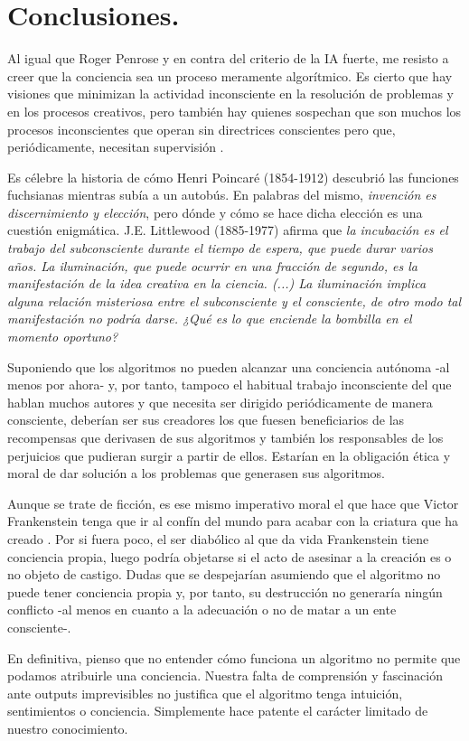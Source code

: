 \documentclass[main.tex]{subfiles}
\begin{document}
\chapter*{Conclusiones.}

Al igual que Roger Penrose y en contra del criterio de la IA fuerte, me resisto a creer que la conciencia sea un proceso meramente algorítmico. Es cierto que hay visiones  que minimizan la actividad inconsciente en la resolución de problemas y en los procesos creativos, pero también hay quienes sospechan que son muchos los procesos inconscientes  que operan sin directrices conscientes pero que, periódicamente, necesitan supervisión \cite{ucm}.

Es célebre la historia de cómo Henri Poincaré (1854-1912) descubrió las funciones fuchsianas mientras subía a un autobús. En palabras del mismo, \textit{invención es discernimiento y elección}, pero dónde y cómo se hace dicha elección es una cuestión enigmática. J.E. Littlewood (1885-1977) afirma que \textit{la incubación es el trabajo del subconsciente durante el tiempo de espera, que puede durar varios años. La iluminación, que puede ocurrir en una fracción de segundo, es la manifestación de la idea creativa en la ciencia. (...) La iluminación implica alguna relación misteriosa entre el subconsciente y el consciente, de otro modo tal manifestación no podría darse. ¿Qué es lo que enciende la bombilla en el momento oportuno?}


Suponiendo que los algoritmos no pueden alcanzar una conciencia autónoma -al menos por ahora- y, por tanto, tampoco el habitual trabajo inconsciente del que hablan muchos autores y que necesita ser dirigido periódicamente de manera consciente, deberían ser sus creadores los que fuesen beneficiarios de las recompensas que derivasen de sus algoritmos y también los responsables de los perjuicios que pudieran surgir a partir de ellos. Estarían en la obligación ética y moral de dar solución a los problemas que generasen sus algoritmos.

Aunque se trate de ficción, es ese mismo imperativo moral el que hace que Victor Frankenstein tenga que ir al confín del mundo para acabar con la criatura que ha creado \cite{shelley2006frankenstein}. Por si fuera poco, el ser diabólico al que da vida Frankenstein tiene conciencia propia, luego podría objetarse si el acto de asesinar a la creación es o no objeto de castigo. Dudas que se despejarían asumiendo que el algoritmo no puede tener conciencia propia y, por tanto, su destrucción no generaría ningún conflicto -al menos en cuanto a la adecuación o no de matar a un ente consciente-.

En definitiva, pienso que no entender cómo funciona un algoritmo no permite que podamos atribuirle una conciencia. Nuestra falta de comprensión y fascinación ante outputs imprevisibles no justifica que el algoritmo tenga intuición, sentimientos o conciencia. Simplemente hace patente el carácter limitado de nuestro conocimiento.
\end{document}
